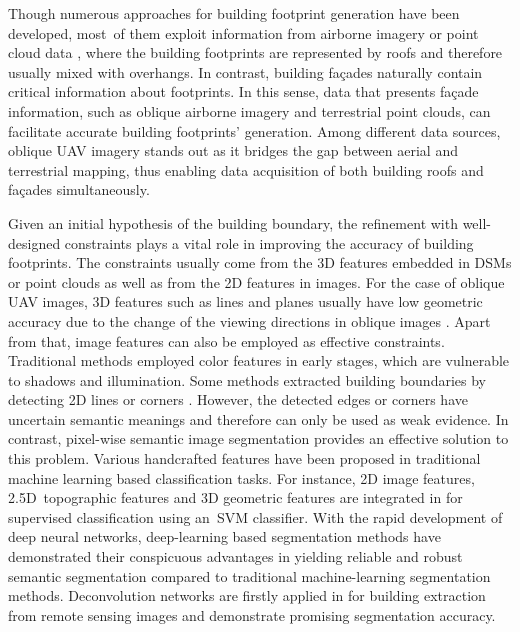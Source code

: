 Though numerous approaches for building footprint generation have been developed, most~of them exploit information from airborne imagery \cite{mueller2005robust} or point cloud data \cite{zhou20102}, where the building footprints are represented by roofs and therefore usually mixed with overhangs. In contrast, building fa\c{c}ades naturally contain critical information about footprints. In this sense, data that presents fa\c{c}ade information, such as oblique airborne imagery and terrestrial point clouds, can facilitate accurate building footprints' generation. Among different data sources, oblique UAV 
imagery stands out as it bridges the gap between aerial and terrestrial mapping, thus enabling data acquisition of both building roofs and fa\c{c}ades simultaneously. 


Given an initial hypothesis of the building boundary, the refinement with well-designed constraints plays a vital role in improving the accuracy of building footprints. The constraints usually come from the 3D features embedded in DSMs 
or point clouds as well as from the 2D features in images. For the case of oblique UAV images, 3D features such as lines \cite{lafarge2012creat} and planes usually have low geometric accuracy due to the change of the viewing directions in oblique images \cite{xiao2015building}. Apart from that, image features can also be employed as effective constraints. Traditional methods employed color features \cite{Sirmacek2008building} in early stages, which are vulnerable to shadows and illumination. Some methods extracted building boundaries by detecting 2D lines \cite{zhu2015feature} or corners \cite{wegner2009fusion}. However, the detected edges or corners have uncertain semantic meanings and therefore can only be used as weak evidence. In contrast, pixel-wise semantic image segmentation provides an effective solution to this problem. Various handcrafted features have been proposed in traditional machine learning based classification tasks. For instance, 2D image features, 2.5D~topographic features and 3D geometric features are integrated in \cite{gevaert2017informal} for supervised classification using an~SVM classifier. With the rapid development of deep neural networks, deep-learning based segmentation methods have demonstrated their conspicuous advantages in yielding reliable and robust semantic segmentation compared to traditional machine-learning segmentation methods. Deconvolution networks are firstly applied in \cite{huang2016building} for building extraction from remote sensing images and demonstrate promising segmentation accuracy.

